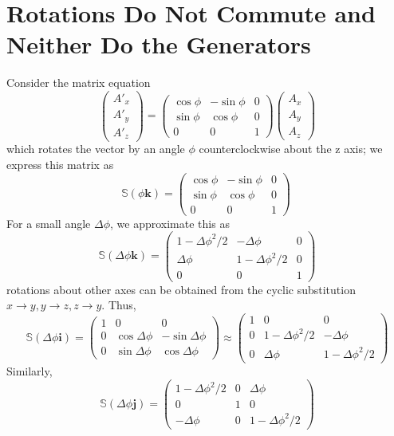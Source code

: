 \documentclass{report}
\begin{document}
\section{Rotations Do Not Commute and Neither Do the Generators}
Consider the matrix equation
\[
	\begin{pmatrix} A'_x \\ A'_y \\ A'_z \end{pmatrix} = \begin{pmatrix} \cos \phi & - \sin \phi & 0 \\ \sin \phi & \cos \phi & 0 \\ 0& 0 & 1 \end{pmatrix}  \begin{pmatrix} A_x \\ A_y \\ A_z \end{pmatrix} 
\] 
which rotates the vector by an angle \(\phi\) counterclockwise about the z axis; we express this matrix as 
\[
\mathbb S (\phi \mathbf k) =  \begin{pmatrix} \cos \phi & - \sin \phi & 0 \\ \sin \phi & \cos \phi & 0 \\ 0& 0 & 1 \end{pmatrix}  \
\] 
For a small angle \(\Delta \phi\), we approximate this as
\[
	\mathbb S (\Delta \phi \mathbf k) = \begin{pmatrix} 1 - \Delta \phi ^2 / 2 & - \Delta \phi & 0 \\ \Delta \phi & 1 - \Delta \phi ^2 /2 & 0 \\ 0 & 0 & 1 \end{pmatrix}  
\]
rotations about other axes can be obtained from the cyclic substitution \(x \to y, y \to z, z \to y\). Thus, 
\[
	\mathbb S(\Delta \phi \mathbf i) = \begin{pmatrix} 1 & 0 & 0 \\ 0 & \cos \Delta \phi & - \sin \Delta \phi \\ 0 & \sin \Delta \phi & \cos \Delta \phi \end{pmatrix} \approx \begin{pmatrix} 1 & 0 & 0 \\ 0 & 1- \Delta \phi^2 /2 & - \Delta \phi \\ 0 & \Delta \phi & 1 - \Delta \phi ^2 /2 \end{pmatrix} 
\] 
Similarly, 
\[
	\mathbb S ( \Delta \phi \mathbf j) = \begin{pmatrix} 1- \Delta \phi^2/2 & 0 & \Delta \phi \\ 0 & 1 & 0 \\ - \Delta \phi & 0 & 1 - \Delta \phi ^2 /2 \end{pmatrix} 
\] 
\end{document}
